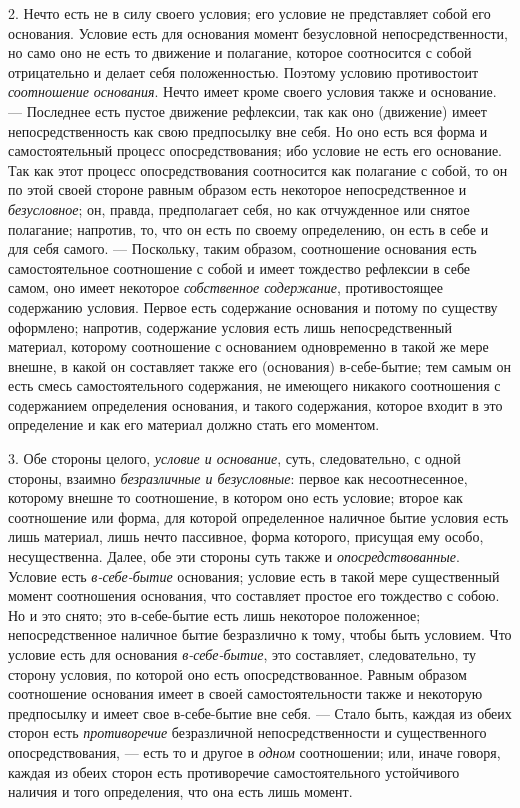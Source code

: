 2. Нечто есть не в силу своего условия; его условие не представляет собой
его основания. Условие есть для основания момент безусловной
непосредственности, но само оно не есть то движение и полагание, которое
соотносится с собой отрицательно и делает себя положенностью. Поэтому
условию противостоит {\em соотношение основания}. Нечто
имеет кроме своего условия также и основание. — Последнее есть пустое
движение рефлексии, так как оно (движение) имеет непосредственность как
свою предпосылку вне себя. Но оно есть вся форма и самостоятельный процесс
опосредствования; ибо условие не есть его основание. Так как этот процесс
опосредствования соотносится как полагание с собой, то он по этой своей
стороне равным образом есть некоторое непосредственное и
{\em безусловное}; он, правда, предполагает себя, но
как отчужденное или снятое полагание; напротив, то, что он есть по своему
определению, он есть в себе и для себя самого. — Поскольку, таким образом,
соотношение основания есть самостоятельное соотношение с собой и имеет
тождество рефлексии в себе самом, оно имеет некоторое
{\em собственное содержание}, противостоящее содержанию
условия. Первое есть содержание основания и потому по существу оформлено;
напротив, содержание условия есть лишь непосредственный материал, которому
соотношение с основанием одновременно в такой же мере внешне, в какой он
составляет также его (основания) в-себе-бытие; тем самым он есть смесь
самостоятельного содержания, не имеющего никакого соотношения с содержанием
определения основания, и такого содержания, которое входит в это
определение и как его материал должно стать его моментом.

3. Обе стороны целого, {\em условие и основание}, суть,
следовательно, с одной стороны, взаимно
{\em безразличные и безусловные}: первое как
несоотнесенное, которому внешне то соотношение, в котором оно есть условие;
второе как соотношение или форма, для которой определенное наличное бытие
условия есть лишь материал, лишь нечто пассивное, форма которого, присущая
ему особо, несущественна. Далее, обе эти стороны суть также и
{\em опосредствованные}. Условие есть
{\em в-себе-бытие} основания; условие есть в такой мере
существенный момент соотношения основания, что составляет простое его
тождество с собою. Но и это снято; это в-себе-бытие есть лишь некоторое
положенное; непосредственное наличное бытие безразлично к тому, чтобы быть
условием. Что условие есть для основания
{\em в-себе-бытие}, это составляет, следовательно, ту
сторону условия, по которой оно есть опосредствованное. Равным образом
соотношение основания имеет в своей самостоятельности также и некоторую
предпосылку и имеет свое в-себе-бытие вне себя. — Стало быть, каждая из
обеих сторон есть {\em противоречие} безразличной
непосредственности и существенного опосредствования, — есть то и другое в
{\em одном} соотношении; или, иначе говоря, каждая из
обеих сторон есть противоречие самостоятельного устойчивого наличия и того
определения, что она есть лишь момент.


